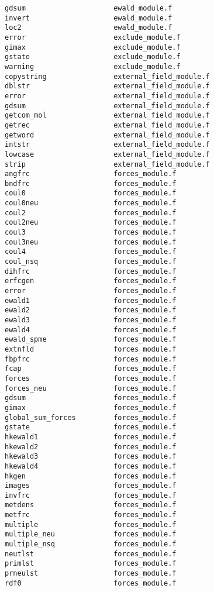 \begin{verbatim}
gdsum                     ewald_module.f
invert                    ewald_module.f
loc2                      ewald_module.f
error                     exclude_module.f
gimax                     exclude_module.f
gstate                    exclude_module.f
warning                   exclude_module.f
copystring                external_field_module.f
dblstr                    external_field_module.f
error                     external_field_module.f
gdsum                     external_field_module.f
getcom_mol                external_field_module.f
getrec                    external_field_module.f
getword                   external_field_module.f
intstr                    external_field_module.f
lowcase                   external_field_module.f
strip                     external_field_module.f
angfrc                    forces_module.f
bndfrc                    forces_module.f
coul0                     forces_module.f
coul0neu                  forces_module.f
coul2                     forces_module.f
coul2neu                  forces_module.f
coul3                     forces_module.f
coul3neu                  forces_module.f
coul4                     forces_module.f
coul_nsq                  forces_module.f
dihfrc                    forces_module.f
erfcgen                   forces_module.f
error                     forces_module.f
ewald1                    forces_module.f
ewald2                    forces_module.f
ewald3                    forces_module.f
ewald4                    forces_module.f
ewald_spme                forces_module.f
extnfld                   forces_module.f
fbpfrc                    forces_module.f
fcap                      forces_module.f
forces                    forces_module.f
forces_neu                forces_module.f
gdsum                     forces_module.f
gimax                     forces_module.f
global_sum_forces         forces_module.f
gstate                    forces_module.f
hkewald1                  forces_module.f
hkewald2                  forces_module.f
hkewald3                  forces_module.f
hkewald4                  forces_module.f
hkgen                     forces_module.f
images                    forces_module.f
invfrc                    forces_module.f
metdens                   forces_module.f
metfrc                    forces_module.f
multiple                  forces_module.f
multiple_neu              forces_module.f
multiple_nsq              forces_module.f
neutlst                   forces_module.f
primlst                   forces_module.f
prneulst                  forces_module.f
rdf0                      forces_module.f

\end{verbatim}
